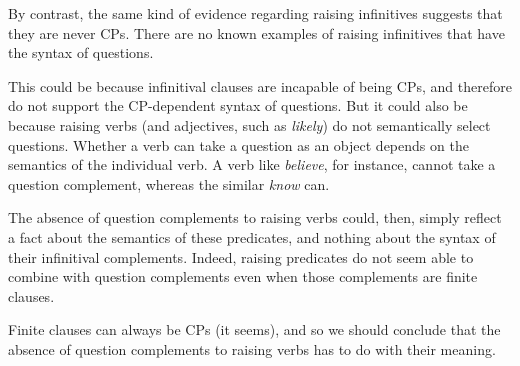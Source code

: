 By contrast, the same kind of evidence regarding raising infinitives suggests that they are never CPs. There are no known examples of raising infinitives that have the syntax of questions.
\begin{exe}
\ex \label{ex3:nowhraise} 
\begin{xlist}
\end{xlist}
\end{exe}
This could be because infinitival clauses are incapable of being CPs, and therefore do not support the CP-dependent syntax of questions. But it could also be because raising verbs (and adjectives, such as \emph{likely}) do not semantically select questions. Whether a verb can take a question as an object depends on the semantics of the individual verb. A verb like \emph{believe}, for instance, cannot take a question complement, whereas the similar \emph{know} can.
\begin{exe}
\ex \label{ex3:questselect} 
\begin{xlist}
\end{xlist}
\end{exe}
The absence of question complements to raising verbs could, then, simply reflect a fact about the semantics of these predicates, and nothing about the syntax of their infinitival complements. Indeed, raising predicates do not seem able to combine with question complements even when those complements are finite clauses.
\begin{exe}
\ex \label{ex3:nowhraise2} 
\begin{xlist}
\end{xlist}
\end{exe}
Finite clauses can always be CPs (it seems), and so we should conclude that the absence of question complements to raising verbs has to do with their meaning.

